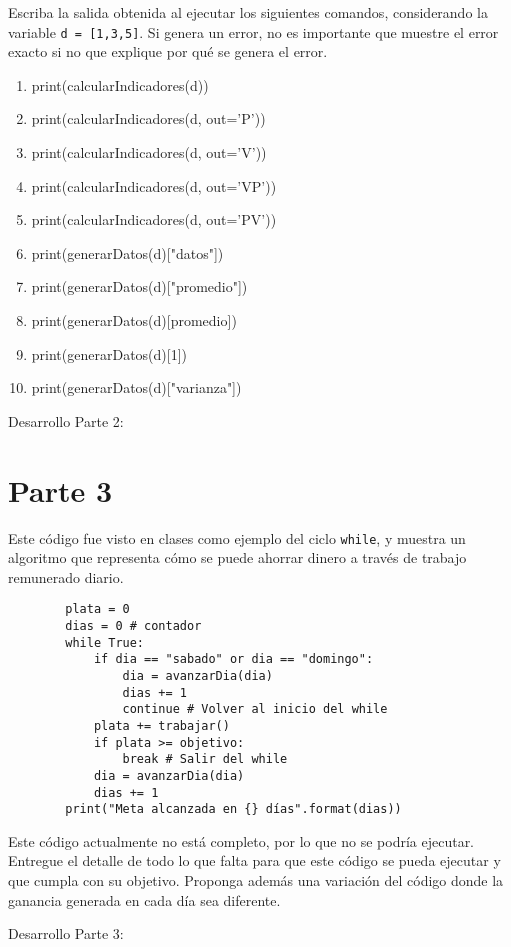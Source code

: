 \documentclass{article}
\newcommand{\note}[1]{\todo[inline,color=gray!20!white]{#1}}
\newcommand{\code}[1]{\texttt{#1}}
\begin{document}
Escriba la salida obtenida al ejecutar los siguientes comandos, considerando la variable \code{d = [1,3,5]}. Si genera un error, no es importante que muestre el error exacto si no que explique por qué se genera el error. 
    \begin{enumerate}
        \item print(calcularIndicadores(d))
        \item print(calcularIndicadores(d, out='P'))
        \item print(calcularIndicadores(d, out='V'))
        \item print(calcularIndicadores(d, out='VP'))
        \item print(calcularIndicadores(d, out='PV'))
        \item print(generarDatos(d)["datos"])
        \item print(generarDatos(d)["promedio"])
        \item print(generarDatos(d)[promedio])
        \item print(generarDatos(d)[1])
        \item print(generarDatos(d)["varianza"])
    \end{enumerate}
\newpage
Desarrollo Parte 2: 

\newpage
\section*{Parte 3}
Este código fue visto en clases como ejemplo del ciclo \code{while}, y muestra un algoritmo que representa cómo se puede ahorrar dinero a través de trabajo remunerado diario.

    \begin{verbatim}
        plata = 0
        dias = 0 # contador
        while True:
            if dia == "sabado" or dia == "domingo":
                dia = avanzarDia(dia)
                dias += 1
                continue # Volver al inicio del while
            plata += trabajar()
            if plata >= objetivo:
                break # Salir del while
            dia = avanzarDia(dia)
            dias += 1
        print("Meta alcanzada en {} días".format(dias))
    \end{verbatim}

Este código actualmente no está completo, por lo que no se podría ejecutar. Entregue el detalle de todo lo que falta para que este código se pueda ejecutar y que cumpla con su objetivo. Proponga además una variación del código donde la ganancia generada en cada día sea diferente. 

\vspace{1cm}
\note{Tiempo: 2 horas.}

\newpage
Desarrollo Parte 3: 
\end{document}

